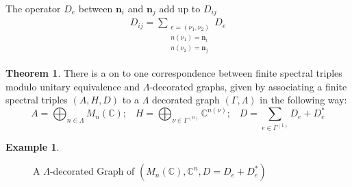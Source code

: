 \documentclass[a4paper]{article}
\theoremstyle{definition}
\theoremstyle{definition}
\theoremstyle{definition}
\newtheorem{example}{Example}
\theoremstyle{theorem}
\newtheorem{theorem}{Theorem}
\theoremstyle{theorem}
\theoremstyle{theorem}
\theoremstyle{definition}
\begin{document}
The operator $D_e$ between $\textbf{n}_i$ and $\textbf{n}_j$ add up to
$D_{ij}$
\begin{align*}
    D_{ij} = \sum\limits_{\substack{e = (\nu _1, \nu _2) \\ n(\nu _1) =
    \textbf{n}_i \\ n(\nu _2) = \textbf{n}_j}} D_e
\end{align*}

\begin{theorem}
    There is a on to one correspondence between finite spectral triples
    modulo unitary equivalence and $\Lambda$-decorated graphs, given by
    associating a finite spectral triples $(A, H, D)$ to  a $\Lambda$ decorated
    graph $(\Gamma, \Lambda)$ in the following way:
    \begin{equation}
        A = \bigoplus _{n\in \Lambda} M_n(\mathbb{C}); \;\;\;
        H = \bigoplus _{\nu \in \Gamma ^{(0)}} \mathbb{C}^{n(\nu)}; \;\;\;
        D = \sum _{e \in \Gamma ^{(1)}} D_e + D_e^*
    \end{equation}
\end{theorem}
\begin{example}
\begin{figure}[h!]
    \centering
    \caption{A $\Lambda$-decorated Graph of $(M_n(\mathbb{C}), \mathbb{C}^n,
    D = D_e + D_e^*)$}
\end{figure}
\end{example}
\end{document}
